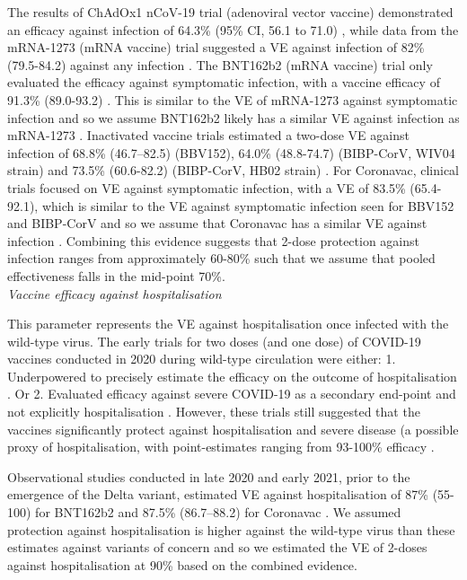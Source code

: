 The results of ChAdOx1 nCoV-19 trial (adenoviral vector vaccine) demonstrated an efficacy against infection of 
64.3\% (95\% CI, 56.1 to 71.0) \cite{falsey2021}, while data from the mRNA-1273 (mRNA vaccine) trial suggested a VE against infection 
of 82\% (79.5-84.2) against any infection \cite{elsahly2021}. The BNT162b2 (mRNA vaccine) trial only evaluated the efficacy 
against symptomatic infection, with a vaccine efficacy of 91.3\% (89.0-93.2) \cite{thomas2021}. This is similar to the VE of 
mRNA-1273 against symptomatic infection and so we assume BNT162b2 likely has a similar VE against infection as mRNA-1273 \cite{elsahly2021, thomas2021}.
Inactivated vaccine trials estimated a two-dose VE against infection of 68.8\% (46.7–82.5) (BBV152), 64.0\% (48.8-74.7) (BIBP-CorV, WIV04 strain) 
and 73.5\% (60.6-82.2) (BIBP-CorV, HB02 strain) \cite{ella2021, alkaabi2021}. For Coronavac, clinical trials focused on VE against 
symptomatic infection, with a VE of 83.5\% (65.4-92.1), which is similar to the VE against symptomatic infection seen for BBV152 and BIBP-CorV and 
so we assume that Coronavac has a similar VE against infection \cite{tanriover2021, ella2021, alkaabi2021}.
Combining this evidence suggests that 2-dose protection against infection ranges from approximately 60-80\% such that we assume that pooled effectiveness falls in the mid-point 70\%.\\

\textit{Vaccine efficacy against hospitalisation}

This parameter represents the VE against hospitalisation once infected with the wild-type virus.
The early trials for two doses (and one dose) of COVID-19 vaccines conducted in 2020 during wild-type circulation were either:
1. Underpowered to precisely estimate the efficacy on the outcome of hospitalisation \cite{falsey2021, tanriover2021}.
Or
2. Evaluated efficacy against severe COVID-19 as a secondary end-point and not explicitly hospitalisation  \cite{elsahly2021, thomas2021, ella2021, alkaabi2021}.
However, these trials still suggested that the vaccines significantly protect against hospitalisation and severe disease (a possible proxy of hospitalisation, with point-estimates ranging from 93-100\% efficacy \cite{falsey2021, tanriover2021, elsahly2021, thomas2021, ella2021, alkaabi2021}.

Observational studies conducted in late 2020 and early 2021, prior to the emergence of the Delta variant, estimated VE against hospitalisation of 87\% (55-100) for BNT162b2 and 87.5\%
(86.7–88.2) for Coronavac \cite{dagan2021, jara2021}. We assumed protection against hospitalisation is higher against the wild-type virus than these estimates against variants of concern 
and so we estimated the VE of 2-doses against hospitalisation at 90\% based on the combined evidence.\\

